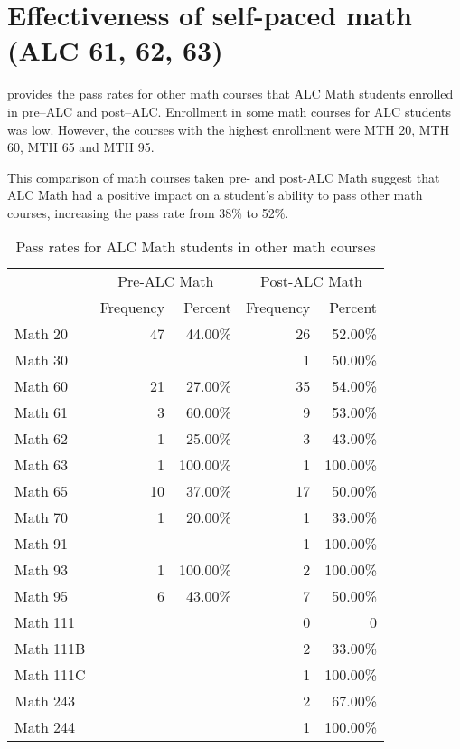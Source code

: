 \chapter{Effectiveness of self-paced math (ALC 61, 62, 63)}
\label{app:sec:effectivenessALC}

 provides the pass rates for other math courses that ALC Math students 
enrolled in pre--ALC and post--ALC.  Enrollment in some math courses for 
ALC students was low.  However, the courses with the highest enrollment 
were MTH 20, MTH 60, MTH 65 and MTH 95.

This comparison of math courses taken pre- and post-ALC Math suggest 
that ALC Math had a positive impact on a student's ability to pass other 
math courses, increasing the pass rate from 38\% to 52\%. 

\begin{table}[!htb]
	\centering
	\caption{Pass rates for ALC Math students in other math courses}
	\label{app:tab:effectivenessALC}
	\begin{tabular}{lrrrr}
		\toprule
		& \multicolumn{2}{c}{Pre-ALC Math}    & \multicolumn{2}{c}{Post-ALC Math}           \\ 
		          & Frequency & Percent  & Frequency & Percent  \\ 
		\midrule
		Math 20   & 47        & 44.00\%  & 26        & 52.00\%  \\ 
		Math 30   &           &          & 1         & 50.00\%  \\ 
		Math 60   & 21        & 27.00\%  & 35        & 54.00\%  \\ 
		Math 61   & 3         & 60.00\%  & 9         & 53.00\%  \\ 
		Math 62   & 1         & 25.00\%  & 3         & 43.00\%  \\ 
		Math 63   & 1         & 100.00\% & 1         & 100.00\% \\ 
		Math 65   & 10        & 37.00\%  & 17        & 50.00\%  \\ 
		Math 70   & 1         & 20.00\%  & 1         & 33.00\%  \\ 
		Math 91   &           &          & 1         & 100.00\% \\ 
		Math 93   & 1         & 100.00\% & 2         & 100.00\% \\ 
		Math 95   & 6         & 43.00\%  & 7         & 50.00\%  \\ 
		Math 111  &           &          & 0         & 0        \\ 
		Math 111B &           &          & 2         & 33.00\%  \\ 
		Math 111C &           &          & 1         & 100.00\% \\ 
		Math 243  &           &          & 2         & 67.00\%  \\ 
		Math 244  &           &          & 1         & 100.00\% \\ 
		\bottomrule
	\end{tabular}
\end{table}
